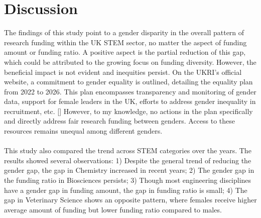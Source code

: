\section{Discussion}

The findings of this study point to a gender disparity in the overall pattern of research funding within the UK STEM sector, no matter the aspect of funding amount or funding ratio. A positive aspect is the partial reduction of this gap, which could be attributed to the growing focus on funding diversity. However, the beneficial impact is not evident and inequities persist. On the UKRI's official website, a commitment to gender equality is outlined, detailing the equality plan from 2022 to 2026. This plan encompasses transparency and monitoring of gender data, support for female leaders in the UK, efforts to address gender inequality in recruitment, etc. [\cite{plan}] However, to my knowledge, no actions in the plan specifically and directly address fair research funding between genders. Access to these resources remains unequal among different genders.\\
\\
This study also compared the trend across STEM categories over the years. The results showed several observations: 1) Despite the general trend of reducing the gender gap, the gap in Chemistry increased in recent years; 2) The gender gap in the funding ratio in Biosciences persists; 3) Though most engineering disciplines have a gender gap in funding amount, the gap in funding ratio is small; 4) The gap in Veterinary Science shows an opposite pattern, where females receive higher average amount of funding but lower funding ratio compared to males.

